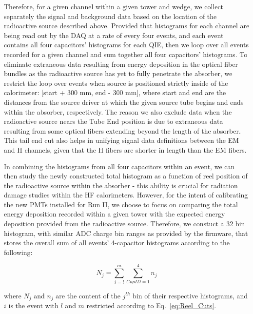 Therefore, for a given channel within a given tower and wedge, we collect
separately the signal and background data based on the location of the
radioactive source described above. Provided that histograms for each channel
are being read out by the DAQ at a rate of every four events, and each event
contains all four capacitors' histograms for each QIE, then we loop over all
events recorded for a given channel and sum together all four capacitors'
histograms. To eliminate extraneous data resulting from energy deposition
in the optical fiber bundles as the radioactive source has yet to fully
penetrate the absorber, we restrict the loop over events when source is positioned strictly inside of the calorimeter: [start + 300 mm, end - 300 mm],
where start and end are the distances from the source driver at
which the given source tube begins and ends within the absorber, respectively.
The reason we also exclude data when the radioactive source nears the Tube End
position is due to extraneous data resulting from some optical fibers extending
beyond the length of the absorber. This tail end cut also helps in unifying
signal data definitions between the EM and H channels, given that the H fibers
are shorter in length than the EM fibers.

In combining the histograms from all four capacitors within an event, we can
then study the newly constructed total histogram as a function of reel position
of the radioactive source within the absorber - this ability is crucial for
radiation damage studies within the HF calorimeters. However, for the intent of
calibrating the new PMTs installed for Run II, we choose to focus on comparing
the total energy deposition recorded within a given tower with the expected
energy deposition provided from the radioactive source. Therefore, we constuct
a 32 bin histogram, with similar ADC charge bin ranges as provided by the
firmware, that stores the overall sum of all events' 4-capacitor histograms
according to the following:

\begin{center}
   \begin{equation}
      \label{eq:Histo_Sum}
      N_j = \sum\limits_{i=l}^m \sum\limits_{CapID=1}^4 n_j
   \end{equation}
\end{center}

where $N_j$ and $n_j$ are the content of the $j^{th}$ bin of their respective
histograms, and $i$ is the event with $l$ and $m$ restricted according to
Eq.~\ref{eq:Reel_Cuts}.

